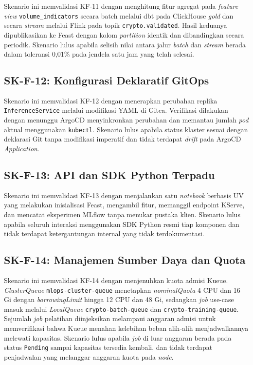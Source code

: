 Skenario ini memvalidasi KF-11 dengan menghitung fitur agregat pada \textit{feature view} \texttt{volume\_indicators} secara batch melalui dbt pada ClickHouse \textit{gold} dan secara \textit{stream} melalui Flink pada topik \texttt{crypto.validated}. Hasil keduanya dipublikasikan ke Feast dengan kolom \textit{partition} identik dan dibandingkan secara periodik. Skenario lulus apabila selisih nilai antara jalur \textit{batch} dan \textit{stream} berada dalam toleransi 0,01\% pada jendela satu jam yang telah selesai.

\subsection{SK-F-12: Konfigurasi Deklaratif GitOps}

Skenario ini memvalidasi KF-12 dengan menerapkan perubahan replika \texttt{InferenceService} melalui modifikasi YAML di Gitea. Verifikasi dilakukan dengan menunggu ArgoCD menyinkronkan perubahan dan memantau jumlah \textit{pod} aktual menggunakan \texttt{kubectl}. Skenario lulus apabila status klaster sesuai dengan deklarasi Git tanpa modifikasi imperatif dan tidak terdapat \textit{drift} pada ArgoCD \textit{Application}.

\subsection{SK-F-13: API dan SDK Python Terpadu}

Skenario ini memvalidasi KF-13 dengan menjalankan satu \textit{notebook} berbasis UV yang melakukan inisialisasi Feast, mengambil fitur, memanggil endpoint KServe, dan mencatat eksperimen MLflow tanpa menukar pustaka klien. Skenario lulus apabila seluruh interaksi menggunakan SDK Python resmi tiap komponen dan tidak terdapat ketergantungan internal yang tidak terdokumentasi.

\subsection{SK-F-14: Manajemen Sumber Daya dan Quota}

Skenario ini memvalidasi KF-14 dengan menjenuhkan kuota admisi Kueue. \textit{ClusterQueue} \texttt{mlops-cluster-queue} menetapkan \textit{nominalQuota} 4 CPU dan 16 Gi dengan \textit{borrowingLimit} hingga 12 CPU dan 48 Gi, sedangkan \textit{job} use-case masuk melalui \textit{LocalQueue} \texttt{crypto-batch-queue} dan \texttt{crypto-training-queue}. Sejumlah \textit{job} pelatihan diinjeksikan melampaui anggaran admisi untuk memverifikasi bahwa Kueue menahan kelebihan beban alih-alih menjadwalkannya melewati kapasitas. Skenario lulus apabila \textit{job} di luar anggaran berada pada status \texttt{Pending} sampai kapasitas tersedia kembali, dan tidak terdapat penjadwalan yang melanggar anggaran kuota pada \textit{node}.


